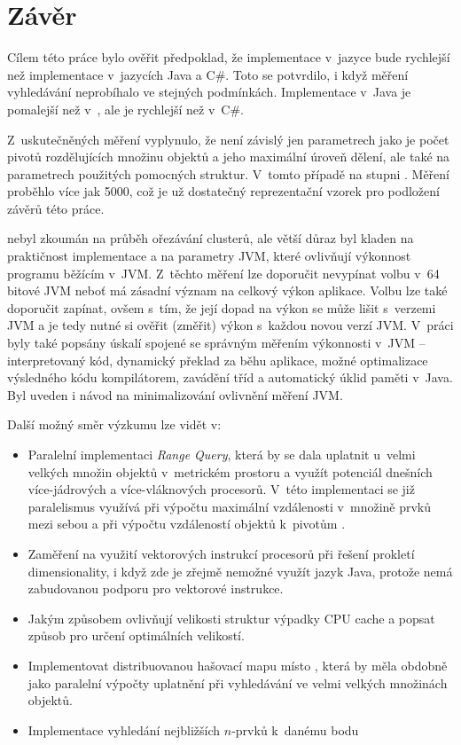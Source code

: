 \chapter{Závěr}

Cílem této práce bylo ověřit předpoklad, že implementace  v~jazyce \CC{} bude rychlejší než implementace v~jazycích Java a C\#.
Toto se potvrdilo, i když měření vyhledávání neprobíhalo ve stejných podmínkách.
Implementace v~Java je pomalejší než v~\CC, ale je rychlejší než v~C\#.

Z~uskutečněných měření vyplynulo, že \MIndex{} není závislý jen parametrech jako je počet pivotů rozdělujících množinu objektů a jeho maximální úroveň dělení, ale také na parametrech použitých pomocných struktur.
V~tomto případě na stupni \BPTree.
Měření proběhlo více jak 5000, což je už dostatečný reprezentační vzorek pro podložení závěrů této práce.

\MIndex{} nebyl zkoumán na průběh ořezávání clusterů, ale větší důraz byl kladen na praktičnost implementace a na parametry JVM, které ovlivňují výkonnost programu běžícím v~JVM.
Z~těchto měření lze doporučit nevypínat volbu  v~64 bitové JVM neboť má zásadní význam na celkový výkon aplikace.
Volbu  lze také doporučit zapínat, ovšem s~tím, že její dopad na výkon se může lišit s~verzemi JVM a je tedy nutné si ověřit (změřit) výkon s~každou novou verzí JVM.
V~práci byly také popsány úskalí spojené se správným měřením výkonnosti v~JVM -- interpretovaný kód, dynamický překlad \bytecode{} za běhu aplikace, možné optimalizace výsledného kódu kompilátorem, zavádění tříd a automatický úklid paměti v~Java.
Byl uveden i návod na minimalizování ovlivnění měření  JVM.

Další možný směr výzkumu  lze vidět v:
\begin{itemize}
\item Paralelní implementaci \emph{Range Query}, která by se dala uplatnit u~velmi velkých množin objektů v~metrickém prostoru a využít potenciál dnešních více-jádrových a více-vláknových procesorů. V~této implementaci se již paralelismus využívá při výpočtu maximální vzdálenosti v~množině prvků mezi sebou a při výpočtu vzdáleností objektů k~pivotům .
\item Zaměření na využití vektorových instrukcí procesorů při řešení prokletí dimensionality, i když zde je zřejmě nemožné využít jazyk Java, protože nemá zabudovanou podporu pro vektorové instrukce.
\item Jakým způsobem ovlivňují velikosti struktur výpadky CPU cache a popsat způsob pro určení optimálních velikostí.
\item Implementovat distribuovanou hašovací mapu místo \BPTree{}, která by měla obdobně jako paralelní výpočty uplatnění při vyhledávání ve velmi velkých množinách objektů.
\item Implementace vyhledání nejbližších $n$-prvků k~danému bodu
 \end{itemize}
 
